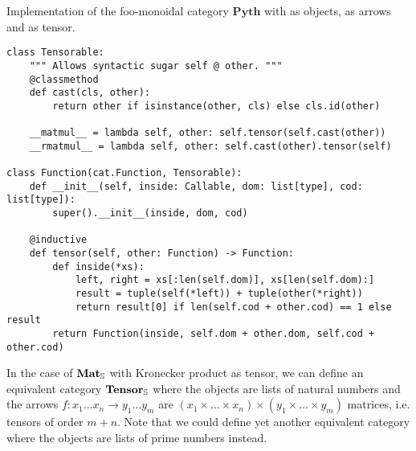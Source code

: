 \begin{python}\label{listing:monoidal.Function}
{\normalfont Implementation of the foo-monoidal category $\mathbf{Pyth}$ with  as objects,  as arrows and  as tensor.}

\begin{verbatim}
class Tensorable:
    """ Allows syntactic sugar self @ other. """
    @classmethod
    def cast(cls, other):
        return other if isinstance(other, cls) else cls.id(other)

    __matmul__ = lambda self, other: self.tensor(self.cast(other))
    __rmatmul__ = lambda self, other: self.cast(other).tensor(self)

class Function(cat.Function, Tensorable):
    def __init__(self, inside: Callable, dom: list[type], cod: list[type]):
        super().__init__(inside, dom, cod)

    @inductive
    def tensor(self, other: Function) -> Function:
        def inside(*xs):
            left, right = xs[:len(self.dom)], xs[len(self.dom):]
            result = tuple(self(*left)) + tuple(other(*right))
            return result[0] if len(self.cod + other.cod) == 1 else result
        return Function(inside, self.dom + other.dom, self.cod + other.cod)
\end{verbatim}
\end{python}

In the case of $\mathbf{Mat}_\S$ with Kronecker product as tensor, we can define an equivalent category $\mathbf{Tensor}_\S$ where the objects are lists of natural numbers and the arrows $f : x_1 \dots x_n \to y_1 \dots y_m$ are $(x_1 \times \dots \times x_n) \times (y_1 \times \dots \times y_m)$ matrices, i.e. tensors of order $m + n$.
Note that we could define yet another equivalent category where the objects are lists of prime numbers instead.

